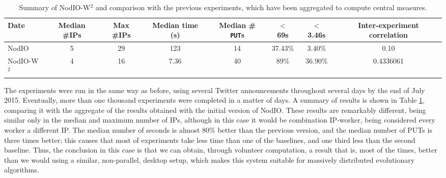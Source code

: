\documentclass[journal,onecolumn]{IEEEtran}
\begin{document}
%
\begin{table}[!htb]
\caption{Summary of {\sf NodIO-W$^2$} and comparison with the previous
  experiments, which have been aggregated to compute central measures. \label{tab:summary:ww}}
\begin{center}
\begin{tabular}{l|ccccccc}
\hline
Date & Median \#IPs & Max \#IPs & Median time (s) & Median \#{\tt
  PUT}s & $<$ 69s & $<$ 3.46s & Inter-experiment correlation\\
\hline
{\sf NodIO} & 5 & 29 & 123 & 14 & 37.43\% & 3.40\% & 0.10 \\
{\sf NodIO-W$^2$} & 4  & 16 & 7.36 & 40 & 89\% & 36.90\% & 0.4336061 \\
\hline
\end{tabular}
\end{center}
\end{table}
%

The experiments were run in the same way as before, using several
Twitter announcements throughout several days by the end of July
2015. Eventually, more than one thousand experiments were completed in
a matter of days. A summary of results is shown in Table
\ref{tab:summary:ww}, comparing it with the aggregate of the results
obtained with the initial version of {\sf NodIO}. These results are
remarkably different, being similar only in the median and maximum
number of IPs, although in this case it would be combination
IP-worker, being considered every worker a different IP. The median
number of seconds is almost 80\% better than the previous version, and
the median number of PUTs is three times better; this causes that most
of experiments take less time than one of the baselines, and one third
less than the second baseline. Thus, the conclusion in this case is
that we can obtain, through volunteer computation, a result that is,
most of the times, better than we would using a similar, non-parallel,
desktop setup, which makes this system suitable for massively
distributed evolutionary algorithms.

\end{document}
